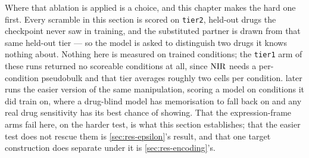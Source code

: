 Where that ablation is applied is a choice, and this chapter makes the hard one
first. Every scramble in this section is scored on \texttt{tier2}, held-out
drugs the checkpoint never saw in training, and the substituted partner is drawn
from that same held-out tier --- so the model is asked to distinguish two drugs
it knows nothing about. Nothing here is measured on trained conditions; the
\texttt{tier1} arm of these runs returned no scoreable conditions at all, since
$\textrm{NIR}$ needs a per-condition pseudobulk and that tier averages roughly two cells
per condition.  later runs the easier version of the same
manipulation, scoring a model on conditions it did train on, where a drug-blind
model has memorisation to fall back on and any real drug sensitivity has its
best chance of showing. That the expression-frame arms fail here, on the harder
test, is what this section establishes; that the easier test does not rescue
them is \cref{sec:res-epsilon}'s result, and that one target construction does
separate under it is \cref{sec:res-encoding}'s.

